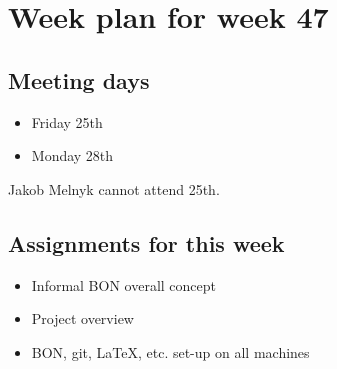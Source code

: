 \section{Week plan for week 47}
\subsection{Meeting days}
\begin{itemize}
\item Friday 25th
\item Monday 28th
\end{itemize}

Jakob Melnyk cannot attend 25th.

\subsection{Assignments for this week}
\begin{itemize}
\item Informal BON overall concept
\item Project overview
\item BON, git, LaTeX, etc. set-up on all machines
\end{itemize}